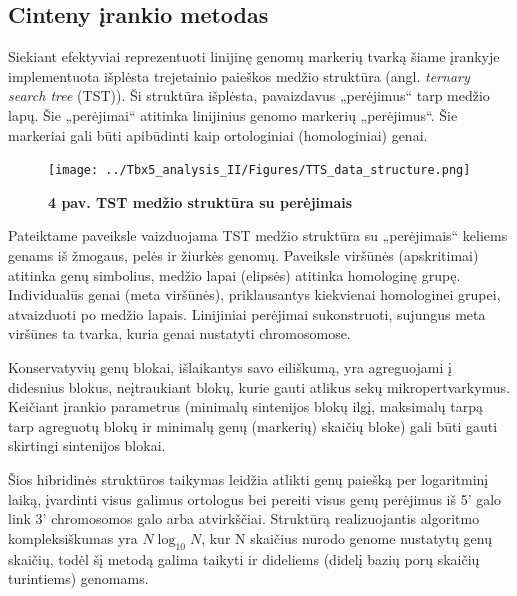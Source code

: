 \documentclass[12pt]{article}
\begin{document}
\subsection{\textbf{Cinteny} įrankio metodas}

Siekiant efektyviai reprezentuoti linijinę genomų markerių tvarką šiame įrankyje
implementuota išplėsta trejetainio paieškos medžio struktūra (angl.
\emph{ternary search tree} (TST)). Ši struktūra išplėsta, pavaizdavus
„perėjimus“ tarp medžio lapų. Šie „perėjimai“ atitinka linijinius genomo
markerių „perėjimus“. Šie markeriai gali būti apibūdinti kaip ortologiniai
(homologiniai) genai.

\begin{figure}[htb]
    \begin{center}
        \texttt{[image: ../Tbx5\_analysis\_II/Figures/TTS\_data\_structure.png]}
        \vspace{-0.5\baselineskip}
        \caption*{\small\textbf{4 pav. TST medžio struktūra su perėjimais}}
        \label{fig:birds}
    \end{center}
\end{figure}

Pateiktame paveiksle vaizduojama TST medžio struktūra su „perėjimais“ keliems
genams iš žmogaus, pelės ir žiurkės genomų. Paveiksle viršūnės (apskritimai)
atitinka genų simbolius, medžio lapai (elipsės) atitinka homologinę grupę.
Individualūs genai (meta viršūnės), priklausantys kiekvienai homologinei
grupei, atvaizduoti po medžio lapais. Linijiniai perėjimai sukonstruoti,
sujungus meta viršūnes ta tvarka, kuria genai nustatyti chromosomose.

Konservatyvių genų blokai, išlaikantys savo eiliškumą, yra agreguojami į
didesnius blokus, neįtraukiant blokų, kurie gauti atlikus sekų
mikropertvarkymus. Keičiant įrankio parametrus (minimalų sintenijos blokų
ilgį, maksimalų tarpą tarp agreguotų blokų ir minimalų genų (markerių) skaičių
bloke) gali būti gauti skirtingi sintenijos blokai.


Šios hibridinės struktūros taikymas leidžia atlikti genų paiešką per logaritminį
laiką, įvardinti visus galimus ortologus bei pereiti visus genų perėjimus iš 5'
galo link 3' chromosomos galo arba atvirkščiai. Struktūrą realizuojantis
algoritmo kompleksiškumas yra $ N\log_{10}N $, kur N skaičius nurodo genome
nustatytų genų skaičių, todėl šį metodą galima taikyti ir dideliems (didelį
bazių porų skaičių turintiems) genomams.


\end{document}
